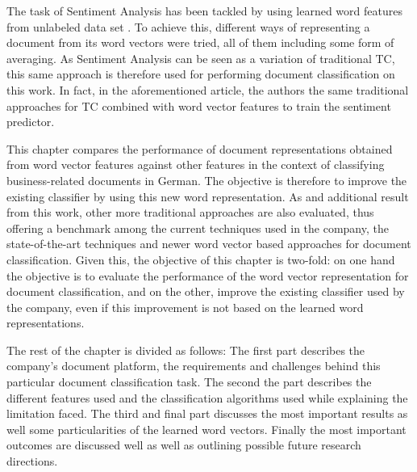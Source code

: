 The task of Sentiment Analysis  has been  tackled by using learned word
features from unlabeled data set \cite{maas2011learning}. To achieve this,
different ways of representing a document from its word vectors were tried,
all of them including some form of averaging. As Sentiment Analysis   can be
seen as a variation of traditional \ac{TC},  this same approach is therefore
used  for performing document classification on this work. In fact, in 
the aforementioned article,  the authors the same  traditional approaches for \ac{TC} combined with word vector features to train the sentiment predictor. 

This chapter compares the performance  of document representations obtained  from  word vector features against other features  in the context of classifying
business-related documents in German. The objective is therefore to
improve the existing classifier by  using this new word representation.
As and additional result from  this work,  other more traditional
approaches  are also evaluated, thus offering a benchmark among the current
techniques used in the company, the state-of-the-art techniques and 
newer word vector based approaches for document classification. Given this,
the objective of this chapter is two-fold:  on one hand the objective is to evaluate the
performance  of the word vector representation for document classification,
and on the other, improve the existing classifier used by the company, even if this improvement is not based on the learned word representations.

The rest of the chapter is divided as follows: The first part describes 
the company's  document platform, the requirements and challenges behind this
particular document classification task. The second the part describes the different features
used and the classification algorithms used while explaining the limitation
faced.  The third and final  part discusses the most important results as
well some particularities of the learned word vectors.  Finally the most
important outcomes are discussed well as well as outlining possible future
research directions.

